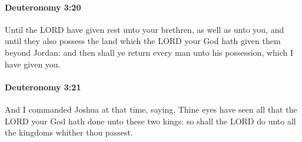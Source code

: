 		\paragraph{Deuteronomy 3:20} %
			\label{DEUTERONOMY-3-20}

			Until the LORD have given rest unto your brethren, as well as unto you, and until they also possess the land which the LORD your God hath given them beyond Jordan: and then shall ye return every man unto his possession, which I have given you.


		\paragraph{Deuteronomy 3:21} %
			\label{DEUTERONOMY-3-21}

			And I commanded Joshua at that time, saying, Thine eyes have seen all that the LORD your God hath done unto these two kings: so shall the LORD do unto all the kingdoms whither thou passest.


